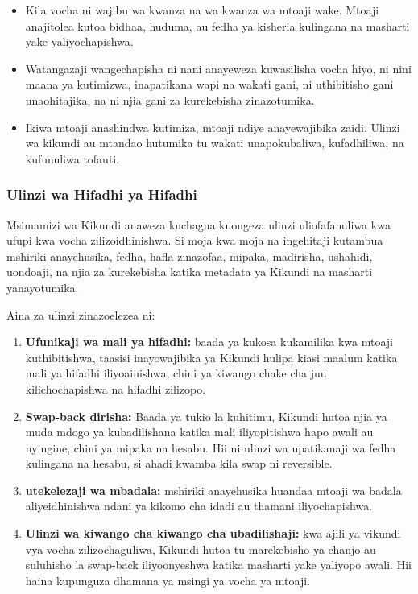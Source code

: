 \documentclass[11pt]{article}
\begin{document}
\begin{itemize}[leftmargin=*]
\item Kila vocha ni wajibu wa kwanza na wa kwanza wa mtoaji wake. Mtoaji anajitolea kutoa bidhaa, huduma, au fedha ya kisheria kulingana na masharti yake yaliyochapishwa.
\item Watangazaji wangechapisha ni nani anayeweza kuwasilisha vocha hiyo, ni nini maana ya kutimizwa, inapatikana wapi na wakati gani, ni uthibitisho gani unaohitajika, na ni njia gani za kurekebisha zinazotumika.
\item Ikiwa mtoaji anashindwa kutimiza, mtoaji ndiye anayewajibika zaidi. Ulinzi wa kikundi au mtandao hutumika tu wakati unapokubaliwa, kufadhiliwa, na kufunuliwa tofauti.
\end{itemize}
\subsubsection*{Ulinzi wa Hifadhi ya Hifadhi}

Msimamizi wa Kikundi anaweza kuchagua kuongeza ulinzi uliofafanuliwa kwa ufupi kwa vocha zilizoidhinishwa. Si moja kwa moja na ingehitaji kutambua mshiriki anayehusika, fedha, hafla zinazofaa, mipaka, madirisha, ushahidi, uondoaji, na njia za kurekebisha katika metadata ya Kikundi na masharti yanayotumika.

Aina za ulinzi zinazoelezea ni:

\begin{enumerate}[leftmargin=*]
\item \textbf{Ufunikaji wa mali ya hifadhi:} baada ya kukosa kukamilika kwa mtoaji kuthibitishwa, taasisi inayowajibika ya Kikundi hulipa kiasi maalum katika mali ya hifadhi iliyoainishwa, chini ya kiwango chake cha juu kilichochapishwa na hifadhi zilizopo.
\item \textbf{Swap-back dirisha:} Baada ya tukio la kuhitimu, Kikundi hutoa njia ya muda mdogo ya kubadilishana katika mali iliyopitishwa hapo awali au nyingine, chini ya mipaka na hesabu. Hii ni ulinzi wa upatikanaji wa fedha kulingana na hesabu, si ahadi kwamba kila swap ni reversible.
\item \textbf{utekelezaji wa mbadala:} mshiriki anayehusika huandaa mtoaji wa badala aliyeidhinishwa ndani ya kikomo cha idadi au thamani iliyochapishwa.
\item \textbf{Ulinzi wa kiwango cha kiwango cha ubadilishaji:} kwa ajili ya vikundi vya vocha zilizochaguliwa, Kikundi hutoa tu marekebisho ya chanjo au suluhisho la swap-back iliyoonyeshwa katika masharti yake yaliyopo awali. Hii haina kupunguza dhamana ya msingi ya vocha ya mtoaji.
\end{enumerate}
\end{document}

